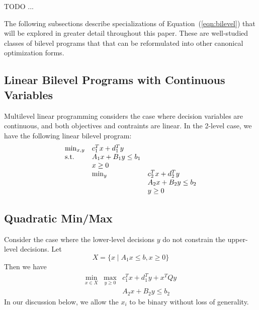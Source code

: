 TODO ...



\label{sec:problems}

The following subsections describe specializations of
Equation~(\ref{eqn:bilevel}) that will be explored in greater detail
throughout this paper.  These are well-studied classes of bilevel
programs that that can be reformulated into other canonical
optimization forms.


\subsection{Linear Bilevel Programs with Continuous Variables}

Multilevel linear programming considers the case where decision
variables are continuous, and both objectives and contraints are
linear.  In the 2-level case, we have the following linear bilevel program:
\begin{equation}
\label{eqn:bilevel_A}
\begin{array}{lll}
\min_{x, y}         & c^T_1 x + d^T_1 y & \\
\textrm{s.t.}                 & A_1 x + B_1 y \leq b_1 & \\
                    & x \geq 0 & \\
                    & \min_{y}  & c^T_2 x + d^T_2 y\\
                    &           & A_2 x + B_2 y \leq b_2\\
                    &           & y \geq 0
\end{array}
\end{equation}


\subsection{Quadratic Min/Max}

Consider the case where the lower-level decisions $y$ do not constrain the upper-level decisions.  Let
\[
X = \{ x \mid A_1 x \leq b, x \geq 0\}
\]
Then we have
\begin{equation}
\label{eqn:bilevel_B}
\begin{array}{lll}
\min_{x \in X} & \max_{y \geq 0} & c^T_1 x + d^T_1 y + x^T Q y\\
& & A_2 x + B_2 y \leq b_2
\end{array}
\end{equation}
In our discussion below, we allow the $x_i$ to be binary without loss of generality.



